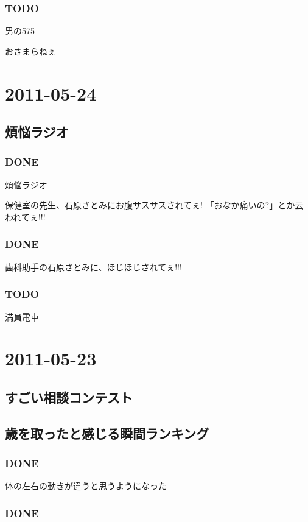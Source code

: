 \documentclass[11pt]{article}
\begin{document}
\subsubsection{\textbf{TODO}}
\label{sec-118_3_2}

男の575

おさまらねぇ 
\section{2011-05-24}
\label{sec-119}
\subsection{煩悩ラジオ}
\label{sec-119_1}
\subsubsection{\textbf{DONE}}
\label{sec-119_1_1}

煩悩ラジオ

保健室の先生、石原さとみにお腹サスサスされてぇ!
「おなか痛いの?」とか云われてぇ!!!
\subsubsection{\textbf{DONE}}
\label{sec-119_1_2}

歯科助手の石原さとみに、ほじほじされてぇ!!!
\subsubsection{\textbf{TODO}}
\label{sec-119_1_3}

満員電車
\section{2011-05-23}
\label{sec-120}
\subsection{すごい相談コンテスト}
\label{sec-120_1}
\subsection{歳を取ったと感じる瞬間ランキング}
\label{sec-120_2}
\subsubsection{\textbf{DONE}}
\label{sec-120_2_1}

体の左右の動きが違うと思うようになった
\subsubsection{\textbf{DONE}}
\label{sec-120_2_2}
\end{document}
